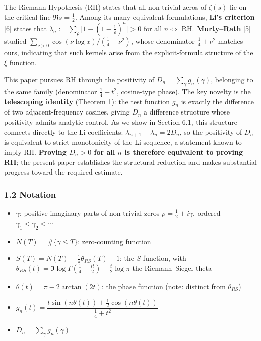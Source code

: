 \documentclass[
]{article}
\providecommand{\tightlist}{%
  \setlength{\itemsep}{0pt}\setlength{\parskip}{0pt}}
\begin{document}
The Riemann Hypothesis (RH) states that all non-trivial zeros of
\(\zeta(s)\) lie on the critical line \(\Re s = \tfrac12\). Among its
many equivalent formulations, \textbf{Li's criterion} {[}6{]} states
that \(\lambda_n := \sum_\rho\big[1-(1-\tfrac1\rho)^n\big] > 0\) for all
\(n \iff\) RH. \textbf{Murty--Rath} {[}5{]} studied
\(\sum_{\nu>0}\cos(\nu\log x)/(\tfrac14+\nu^2)\), whose denominator
\(\tfrac14+\nu^2\) matches ours, indicating that such kernels arise from
the explicit-formula structure of the \(\xi\) function.

This paper pursues RH through the positivity of
\(D_n = \sum_\gamma g_n(\gamma)\), belonging to the same family
(denominator \(\tfrac14+t^2\), cosine-type phase). The key novelty is
the \textbf{telescoping identity} (Theorem 1): the test function \(g_n\)
is exactly the difference of two adjacent-frequency cosines, giving
\(D_n\) a difference structure whose positivity admits analytic control.
As we show in Section 6.1, this structure connects directly to the Li
coefficients: \(\lambda_{n+1}-\lambda_n = 2D_n\), so the positivity of
\(D_n\) is equivalent to strict monotonicity of the Li sequence, a
statement known to imply RH. \textbf{Proving \(D_n > 0\) for all \(n\)
is therefore equivalent to proving RH}; the present paper establishes
the structural reduction and makes substantial progress toward the
required estimate.

\hypertarget{notation}{%
\subsubsection{1.2 Notation}\label{notation}}

\begin{itemize}
\tightlist
\item
  \(\gamma\): positive imaginary parts of non-trivial zeros
  \(\rho = \tfrac12+i\gamma\), ordered \(\gamma_1 < \gamma_2 < \cdots\)
\item
  \(N(T) = \#\{\gamma \le T\}\): zero-counting function
\item
  \(S(T) = N(T) - \frac1\pi\theta_{RS}(T) - 1\): the \(S\)-function,
  with
  \(\theta_{RS}(t) = \Im\log\Gamma(\tfrac14 + \tfrac{it}{2}) - \tfrac t2\log\pi\)
  the Riemann--Siegel theta
\item
  \(\theta(t) = \pi - 2\arctan(2t)\): the phase function (note: distinct
  from \(\theta_{RS}\))
\item
  \(g_n(t) = \dfrac{t\sin(n\theta(t)) + \tfrac12\cos(n\theta(t))}{\tfrac14 + t^2}\)
\item
  \(D_n = \sum_\gamma g_n(\gamma)\)
\end{itemize}
\end{document}
